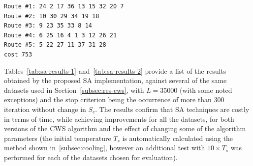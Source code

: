 \begin{lstlisting}[label=lst:routes-sa,caption={Routes and solution 
value obtained after running the proposed SA implementation 
metaheuristic, against the dataset A-n38-k5.}]
Route #1: 24 2 17 36 13 15 32 20 7
Route #2: 10 30 29 34 19 18
Route #3: 9 23 35 33 8 14
Route #4: 6 25 16 4 1 3 12 26 21
Route #5: 5 22 27 11 37 31 28
cost 753

\end{lstlisting}

Tables~\ref{tab:sa-results-1} and~\ref{tab:sa-results-2} provide a list of the 
results obtained by the proposed SA implementation, against several of the 
same datasets used in Section~\ref{subsec:res-cws}, with $L = 35000$ (with 
some noted exceptions) and the 
stop criterion being the occurrence of more than 300 iteration without change in 
$S_c$. The results confirm that 
SA techniques are costly in terms of time, while achieving improvements for 
all the datasets, for both versions of the CWS algorithm and the effect of 
changing some of the algorithm parameters (the initial temperature $T_s$ is 
automatically calculated using the method shown 
in~\ref{subsec:cooling}, however an additional test with $10 \times T_s$ was 
performed for each of the datasets chosen for evaluation).\vertbreak

